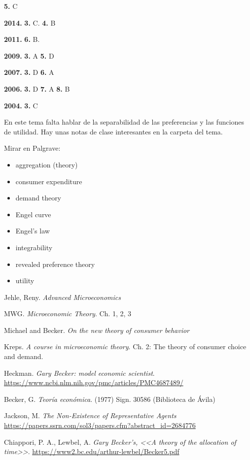 \documentclass{nuevotema}
\begin{document}
\textbf{5.} C

\textbf{2014.} \textbf{3.} C. \textbf{4.} B

\textbf{2011.} \textbf{6.} B.

\textbf{2009.} \textbf{3.} A \textbf{5.} D

\textbf{2007.} \textbf{3.} D \textbf{6.} A

\textbf{2006.} \textbf{3.} D \textbf{7.} A  \textbf{8.} B

\textbf{2004.} \textbf{3.} C


En este tema falta hablar de la separabilidad de las preferencias y las funciones de utilidad. Hay unas notas de clase interesantes en la carpeta del tema.


\bibliografia

Mirar en Palgrave:
\begin{itemize}
	\item aggregation (theory)
	\item consumer expenditure
	\item demand theory
	\item Engel curve
	\item Engel's law
	\item integrability
    \item revealed preference theory
    \item utility
\end{itemize}


Jehle, Reny. \textit{Advanced Microeconomics}

MWG. \textit{Microeconomic Theory}. Ch. 1, 2, 3

Michael and Becker. \textit{On the new theory of consumer behavior}

Kreps. \textit{A course in microeconomic theory}. Ch. 2: The theory of consumer choice and demand.

Heckman. \textit{Gary Becker: model economic scientist}. \url{https://www.ncbi.nlm.nih.gov/pmc/articles/PMC4687489/}

Becker, G. \textit{Teoría económica}. (1977) Sign. 30586 (Biblioteca de Ávila)

Jackson, M. \textit{The Non-Existence of Representative Agents} \url{https://papers.ssrn.com/sol3/papers.cfm?abstract\_id=2684776}

Chiappori, P. A., Lewbel, A. \textit{Gary Becker's, <<A theory of the allocation of time>>}. \url{https://www2.bc.edu/arthur-lewbel/Becker5.pdf}
\end{document}
